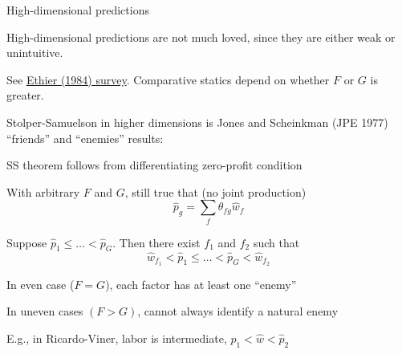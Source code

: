 \documentclass[11pt,notes=hide,aspectratio=169]{beamer}
\begin{document}
\begin{frame}{High-dimensional predictions}
\begin{itemize}{\footnotesize
	\item High-dimensional predictions are not much loved, since they are either weak or unintuitive.
	\item See \href{https://doi.org/10.1016/S1573-4404(84)01006-6}{Ethier (1984) survey}. Comparative statics depend on whether $F$ or $G$ is greater.
\par}\end{itemize}
Stolper-Samuelson in higher dimensions is Jones and Scheinkman (JPE 1977) ``friends'' and ``enemies'' results:
\begin{itemize}{\small
	\item SS theorem follows from differentiating zero-profit condition
	\item With arbitrary $F$ and $G$, still true that (no joint production)
	\begin{equation*}
		\hat{p}_g = \sum_f \theta_{fg} \hat{w}_f
	\end{equation*}
	\item Suppose $\hat{p}_1 \leq \dots < \hat{p}_G$. 
	Then there exist $f_1$ and $f_2$ such that 
	\begin{equation*}
		\hat{w}_{f_1} <  \hat{p}_1 \leq \dots < \hat{p}_G < \hat{w}_{f_2}
	\end{equation*}
	\item In even case ($F=G$), each factor has at least one ``enemy''
	\item In uneven cases $(F>G)$, cannot always identify a natural enemy
	\item[] E.g., in Ricardo-Viner, labor is intermediate, $\hat{p}_1 < \hat{w} < \hat{p}_2$
\par}\end{itemize}
\end{frame}
\end{document}
